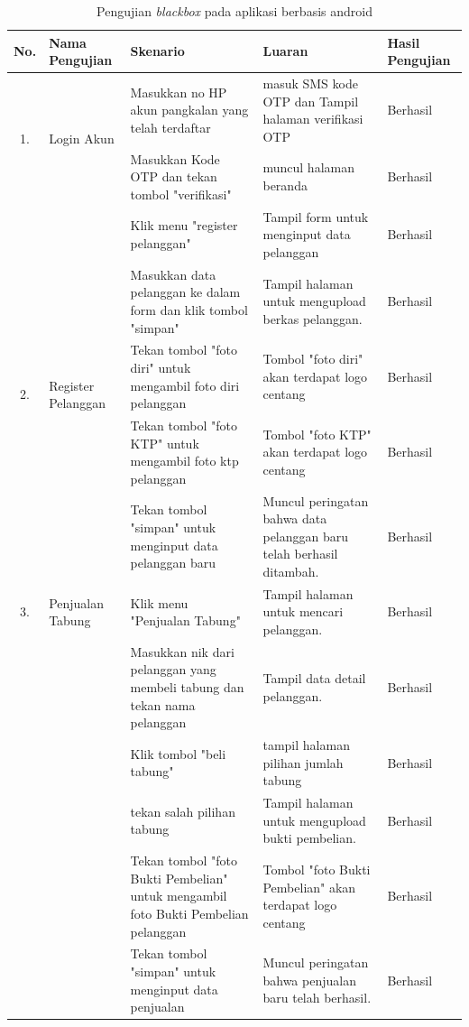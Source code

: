 	\begin{longtable}{ |c|p{3cm}|p{3cm}|p{3cm}|p{2cm}|}
		\caption{Pengujian \textit{blackbox} pada aplikasi berbasis android}
		\label{ujiMobile} \\ \hline
		\textbf{No.}                  &  \textbf{Nama Pengujian}         & \textbf{Skenario}                                       & \textbf{Luaran}              & \textbf{Hasil Pengujian} \\ \hline
		
		
		\multirow{2}{*}{1.}  & 	\multirow{2}{*}{Login Akun} & Masukkan no HP akun pangkalan yang telah terdaftar           & masuk SMS kode OTP dan  Tampil halaman verifikasi OTP         & Berhasil \\ \hline
		& & Masukkan Kode OTP dan tekan tombol "verifikasi"           & muncul halaman beranda         & Berhasil \\ \hline
		
		\multirow{5}{*}{2.}  & 	\multirow{5}{*}{\parbox{3cm}{\centering Register Pelanggan}} & Klik menu "register pelanggan"           & Tampil form untuk menginput data pelanggan            & Berhasil \\ \cline{3-5}
		& & Masukkan data pelanggan ke dalam form dan klik tombol "simpan"           & Tampil halaman untuk mengupload berkas pelanggan.             & Berhasil \\ \cline{3-5}
		& &  Tekan tombol "foto diri" untuk mengambil foto diri pelanggan        & Tombol "foto diri" akan terdapat logo centang             & Berhasil \\ \cline{3-5}
		& &  Tekan tombol "foto KTP" untuk mengambil foto ktp pelanggan        & Tombol "foto KTP" akan terdapat logo centang             & Berhasil \\ \hline
		& &  Tekan tombol "simpan" untuk menginput data pelanggan baru   & Muncul peringatan bahwa data pelanggan baru telah berhasil ditambah.             & Berhasil \\ \cline{3-5}
		
		\multirow{1}{*}{3.}  & 	\multirow{1}{*}{Penjualan Tabung} & Klik menu "Penjualan Tabung"          & Tampil halaman untuk mencari pelanggan.             & Berhasil \\ \cline{3-5}
		\multirow{5}{*}{} & \multirow{5}{*}{} & Masukkan nik dari pelanggan yang membeli tabung dan tekan nama pelanggan           & Tampil data detail pelanggan.             & Berhasil \\ \cline{3-5}
		& & Klik tombol "beli tabung"           & tampil halaman pilihan jumlah tabung & Berhasil
		 \\ \hline
		& & tekan salah pilihan tabung           & Tampil halaman untuk mengupload bukti pembelian.             & Berhasil \\ \cline{3-5}
		& &  Tekan tombol "foto Bukti Pembelian" untuk mengambil foto Bukti Pembelian pelanggan        & Tombol "foto Bukti Pembelian" akan terdapat logo centang             & Berhasil \\ \cline{3-5}
		& &  Tekan tombol "simpan" untuk menginput data penjualan  & Muncul peringatan bahwa penjualan baru telah berhasil.             & Berhasil \\ \hline
		

\end{longtable}
